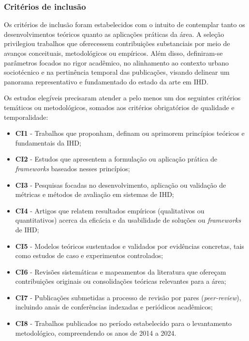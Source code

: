 \documentclass[
	12pt,				%
	oneside,			%
	a4paper,			%
	english,			%
	brazil				%
	]{abntex2ppgsi}
\begin{document}
    \subsubsection{Critérios de inclusão}\label{crit:Inclu}
    
    Os critérios de inclusão foram estabelecidos com o intuito de contemplar tanto os desenvolvimentos teóricos quanto as aplicações práticas da área. A seleção privilegiou trabalhos que oferecessem contribuições substanciais por meio de avanços conceituais, metodológicos ou empíricos. Além disso, definiram-se parâmetros focados no rigor acadêmico, no alinhamento ao contexto urbano sociotécnico e na pertinência temporal das publicações, visando delinear um panorama representativo e fundamentado do estado da arte em IHD.
    
    Os estudos elegíveis precisaram atender a pelo menos um dos seguintes critérios temáticos ou metodológicos, somados aos critérios obrigatórios de qualidade e temporalidade:

\begin{itemize}
\item[] \textbf{CI1} - Trabalhos que proponham, definam ou aprimorem princípios teóricos e fundamentais da IHD;
\item[] \textbf{CI2} - Estudos que apresentem a formulação ou aplicação prática de \textit{frameworks} baseados nesses princípios;
\item[] \textbf{CI3} - Pesquisas focadas no desenvolvimento, aplicação ou validação de métricas e métodos de avaliação em sistemas de IHD;
\item[] \textbf{CI4} - Artigos que relatem resultados empíricos (qualitativos ou quantitativos) acerca da eficácia e da usabilidade de soluções ou \textit{frameworks} de IHD;
\item[] \textbf{CI5} - Modelos teóricos sustentados e validados por evidências concretas, tais como estudos de caso e experimentos controlados;
\item[] \textbf{CI6} - Revisões sistemáticas e mapeamentos da literatura que ofereçam contribuições originais ou consolidações teóricas relevantes para a área;
\item[] \textbf{CI7} - Publicações submetidas a processo de revisão por pares (\textit{peer-review}), incluindo anais de conferências indexadas e periódicos acadêmicos;
\item[] \textbf{CI8} - Trabalhos publicados no período estabelecido para o levantamento metodológico, compreendendo os anos de 2014 a 2024.
\end{itemize}
\end{document}
